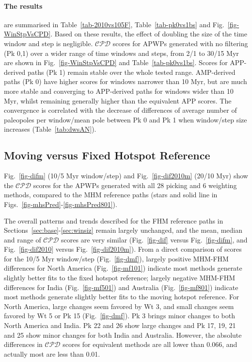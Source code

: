 \paragraph{The results}
are summarised in Table~\ref{tab-2010vs105F}, Table~\ref{tab-pk0vs1bs} and
Fig.~\ref{fig-WinStpVsCPD}. Based on these results, the effect of doubling the
size of the time window and step is negligible. $\mathcal{CPD}$ scores for APWPs
generated with no filtering (Pk 0,1) over a wider range of time windows and
steps, from 2/1 to 30/15 Myr are shown in Fig.~\ref{fig-WinStpVsCPD} and
Table~\ref{tab-pk0vs1bs}. Scores for APP-derived paths (Pk 1) remain stable over
the whole tested range. AMP-derived paths (Pk 0) have higher scores for windows
narrower than 10 Myr, but are much more stable and converging to APP-derived
paths for windows wider than 10 Myr, whilst remaining generally
higher than the equivalent APP scores. The convergence is correlated with the
decrease of differences of average number of paleopoles per window/mean pole
between Pk 0 and Pk 1 when window/step size increases (Table~\ref{tab:dwsAN}).


\subsection{Moving versus Fixed Hotspot Reference}

Fig.~\ref{fig-difm} (10/5 Myr window/step) and Fig.~\ref{fig-dif2010m} (20/10
Myr) show the $\mathcal{CPD}$ scores for the APWPs generated with all 28 picking
and 6 weighting methods, compared to the MHM reference paths (stars and solid
line in Figs.~\ref{fig-mhsPred}-\ref{fig-mhsPred801}).

The overall patterns and trends described for the FHM reference paths in
Sections~\ref{sec:base}-\ref{sec:winsiz} remain largely unchanged, and the mean,
median and range of $\mathcal{CPD}$ scores are very similar (Fig.~\ref{fig-dif}
versus Fig.~\ref{fig-difm}, and Fig.~\ref{fig-dif2010} versus
Fig.~\ref{fig-dif2010m}). From a direct comparison of scores for the 10/5 Myr
window/step (Fig.~\ref{fig-dmf}), largely positive MHM-FHM differences for North
America (Fig.~\ref{fig-mf101}) indicate most methods generate slightly better
fits to the fixed hotspot reference; largely negative MHM-FHM differences for
India (Fig.~\ref{fig-mf501}) and Australia (Fig.~\ref{fig-mf801}) indicate most
methods generate slightly better fits to the moving hotspot reference. For North
America, large changes seem favored by Wt 3, and small changes seem favored by
Wt 5 or Pk 15 (Fig.~\ref{fig-dmf}). Pk 3 brings minor changes to both North
America and India. Pk 22 and 26 show large changes and Pk 17, 19, 21 and 25 show
minor changes for both India and Australia. However, the absolute differences in
$\mathcal{CPD}$ scores for equivalent methods are all lower than 0.066, and
actually most are less than 0.01.

